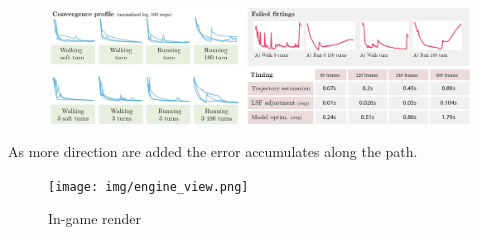 
\begin{figure}
    \centering
    \includegraphics[width=1.0\columnwidth]{img/stats.png}
    \caption{}
    \label{fig:results:stats}
\end{figure}



As more direction are added the error accumulates along the path.
\begin{figure}
    \centering
    \texttt{[image: img/engine\_view.png]}
    \caption{In-game render}
    \label{fig:results:engine_view}
\end{figure}







